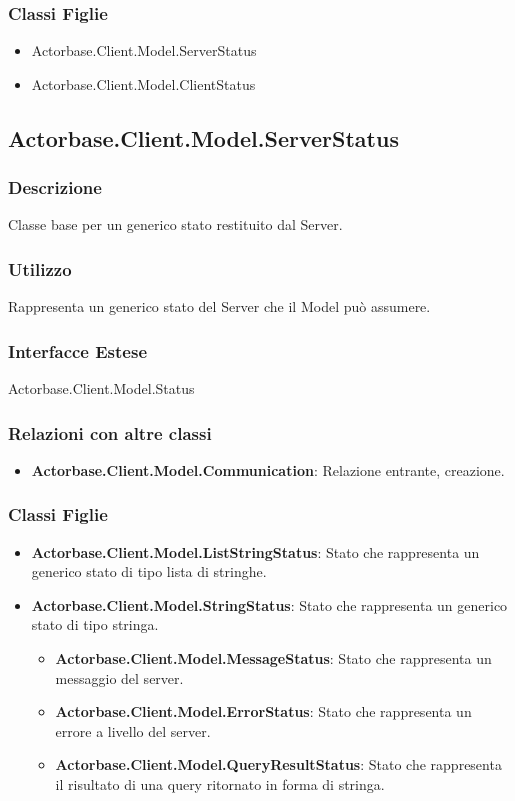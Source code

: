 \documentclass[a4paper]{article}
\begin{document}
			\subsubsection{Classi Figlie}
				\begin{itemize}
					\item Actorbase.Client.Model.ServerStatus
					\item Actorbase.Client.Model.ClientStatus		
				\end{itemize}
			
		\subsection{Actorbase.Client.Model.ServerStatus}
			\subsubsection{Descrizione}
				Classe base per un generico stato restituito dal Server.
			\subsubsection{Utilizzo}
				Rappresenta un generico stato del Server che il Model può assumere.
			\subsubsection{Interfacce Estese}
				Actorbase.Client.Model.Status
			\subsubsection{Relazioni con altre classi}
				\begin{itemize}
					\item \textbf{Actorbase.Client.Model.Communication}: Relazione entrante, creazione.
				\end{itemize}
			\subsubsection{Classi Figlie}
				\begin{itemize}
					\item \textbf{Actorbase.Client.Model.ListStringStatus}:
						Stato che rappresenta un generico stato di tipo lista di stringhe.
					\item \textbf{Actorbase.Client.Model.StringStatus}:
						Stato che rappresenta un generico stato di tipo stringa.
					\begin{itemize}
						\item \textbf{Actorbase.Client.Model.MessageStatus}:
							Stato che rappresenta un messaggio del server.
						\item \textbf{Actorbase.Client.Model.ErrorStatus}:
							Stato che rappresenta un errore a livello del server.
						\item \textbf{Actorbase.Client.Model.QueryResultStatus}:
							Stato che rappresenta il risultato di una query ritornato in forma di stringa.
					\end{itemize}
				\end{itemize}
				
\end{document}
